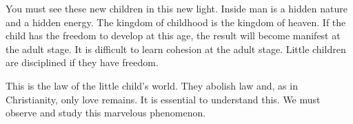 \documentclass[lang=cn,10pt]{elegantbook}
\begin{document}
You must see these new children in this new light. Inside man is a hidden nature and a hidden energy. The kingdom of childhood is the kingdom of heaven. If the child has the freedom to develop at this age, the result will become manifest at the adult stage. It is difficult to learn cohesion at the adult stage. Little children are disciplined if they have freedom.

This is the law of the little child's world. They abolish law and, as in Christianity, only love remains. It is essential to understand this. We must observe and study this marvelous phenomenon.
\end{document}
